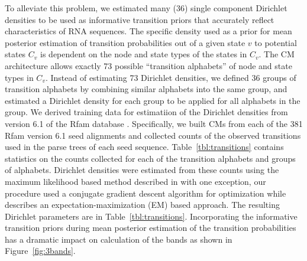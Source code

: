 \documentclass[11pt]{article}
\begin{document}
To alleviate this problem, we estimated many (36) single component Dirichlet
densities to be used as informative transition priors that accurately
reflect characteristics of RNA sequences. The specific density used as
a prior for mean posterior estimation of transition probabilities out
of a given state $v$ to potential states $C_v$ is dependent on the node and
state types of the states in $C_v$. The CM architecture allows exactly
73 possible ``transition alphabets'' of node and state types in
$C_v$. Instead of estimating 73 Dirichlet densities, we defined 36
groups of transition alphabets by combining similar alphabets into the
same group, and estimated a Dirichlet density for each group to be
applied for all alphabets in the group. We derived training data for
estimatiion of the Dirichlet densities from version 6.1 of the Rfam
database \cite{Griffiths-Jones05}.
Specifically, we built CMs from each of the 381 Rfam version 6.1 seed
alignments and collected counts of the
observed transitions used in the parse trees of each seed sequence.
Table~\ref{tbl:transitions} contains statistics on the counts collected
for each of the transition alphabets and groups of alphabets.
Dirichlet densities were estimated from these counts using the maximum
likelihood based method described in \cite{Sjolander96} with one
exception, our procedure used a conjugate gradient descent algorithm
\cite{Press93} for optimization while \cite{Sjolander96} describes an
expectation-maximization (EM) based approach.  The resulting Dirichlet
parameters are in Table~\ref{tbl:transitions}.  
Incorporating the informative transition priors during mean posterior
estimation of the transition probabilities has a dramatic impact
on calculation of the bands as shown in Figure~\ref{fig:3bands}.
\end{document}
